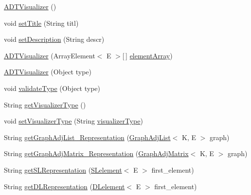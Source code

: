 \begin{DoxyCompactItemize}
\item 
\hyperlink{classbridges_1_1base_1_1_a_d_t_visualizer_a3d5098e4c0609c19a547f19f0d538eeb}{A\+D\+T\+Visualizer} ()
\item 
void \hyperlink{classbridges_1_1base_1_1_a_d_t_visualizer_ab0fda74356fefe16f5b3b98a5fce1f9e}{set\+Title} (String titl)
\item 
void \hyperlink{classbridges_1_1base_1_1_a_d_t_visualizer_ab00d1c82e11326ce68c0146bc393c4b1}{set\+Description} (String descr)
\item 
\hyperlink{classbridges_1_1base_1_1_a_d_t_visualizer_acd2d6c0459173578f4fd95ac4d05cd10}{A\+D\+T\+Visualizer} (Array\+Element$<$ E $>$\mbox{[}$\,$\mbox{]} \hyperlink{classbridges_1_1base_1_1_a_d_t_visualizer_a320739b4be463d3987b3de2463b0d592}{element\+Array})
\item 
\hyperlink{classbridges_1_1base_1_1_a_d_t_visualizer_af722d7ea9506b1ca8119ae39c43130ff}{A\+D\+T\+Visualizer} (Object type)
\item 
void \hyperlink{classbridges_1_1base_1_1_a_d_t_visualizer_a991fc08ab102bc0f861e0aefe75282e7}{validate\+Type} (Object type)
\item 
String \hyperlink{classbridges_1_1base_1_1_a_d_t_visualizer_aea37161ff4b74fbeae6f478b4c2e1a50}{get\+Visualizer\+Type} ()
\item 
void \hyperlink{classbridges_1_1base_1_1_a_d_t_visualizer_a5f423ff4295f3ae4371c86d4ab45638c}{set\+Visualizer\+Type} (String \hyperlink{classbridges_1_1base_1_1_a_d_t_visualizer_a288aece657b5641f48e839b34f3884b9}{visualizer\+Type})
\item 
String \hyperlink{classbridges_1_1base_1_1_a_d_t_visualizer_a0b923e3a1afd3d56b5c42ef39e4c5542}{get\+Graph\+Adj\+List\+\_\+\+Representation} (\hyperlink{classbridges_1_1base_1_1_graph_adj_list}{Graph\+Adj\+List}$<$ K, E $>$ graph)
\item 
String \hyperlink{classbridges_1_1base_1_1_a_d_t_visualizer_a7e3ecfc9522596bd12f0adef694eacf2}{get\+Graph\+Adj\+Matrix\+\_\+\+Representation} (\hyperlink{classbridges_1_1base_1_1_graph_adj_matrix}{Graph\+Adj\+Matrix}$<$ K, E $>$ graph)
\item 
String \hyperlink{classbridges_1_1base_1_1_a_d_t_visualizer_a8bfd44ca6eef7b19feb6061cb7e141ef}{get\+S\+L\+Representation} (\hyperlink{classbridges_1_1base_1_1_s_lelement}{S\+Lelement}$<$ E $>$ first\+\_\+element)
\item 
String \hyperlink{classbridges_1_1base_1_1_a_d_t_visualizer_a43eeb9f3321477f58edc3aff52631f3b}{get\+D\+L\+Representation} (\hyperlink{classbridges_1_1base_1_1_d_lelement}{D\+Lelement}$<$ E $>$ first\+\_\+element)

\end{DoxyCompactItemize}
